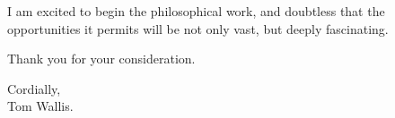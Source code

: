 I am excited to begin the philosophical work, and doubtless that the opportunities it permits will be not only vast, but deeply fascinating.\par\medskip

Thank you for your consideration.

\bigskip
\begin{flushright}
    Cordially,\\
    Tom Wallis.
\end{flushright}




